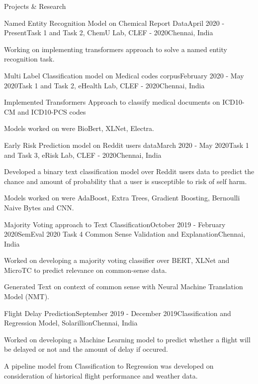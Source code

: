 \documentclass{resume} %
\begin{document}
\begin{rSection}{Projects \& Research}


\begin{rSubsection}{Named Entity Recognition Model on Chemical Report Data}{April 2020 - Present}{Task 1 and Task 2, ChemU Lab, CLEF - 2020}{Chennai, India}
\item Working on implementing transformers approach to solve a named entity recognition task. 
\end{rSubsection}

\begin{rSubsection}{Multi Label Classification model on Medical codes corpus}{February 2020 - May 2020}{Task 1 and Task 2, eHealth Lab, CLEF - 2020}{Chennai, India}
\item Implemented Transformers Approach to classify medical documents on  ICD10-CM and ICD10-PCS codes
\item Models worked on were BioBert, XLNet, Electra. 
\end{rSubsection}

\begin{rSubsection}{Early Risk Prediction model on Reddit users data}{March 2020 - May 2020}{Task 1 and Task 3, eRisk Lab, CLEF - 2020}{Chennai, India}
\item Developed a binary text classification model over Reddit users data to predict the chance and amount of probability that a user is susceptible to risk of self harm.
\item Models worked on were AdaBoost, Extra Trees, Gradient Boosting, Bernoulli Naive Bytes and CNN.
\end{rSubsection}

\begin{rSubsection}{Majority Voting approach to Text Classification}{October 2019 - February 2020}{SemEval 2020 Task 4 Common Sense Validation and Explanation}{Chennai, India}
\item Worked on developing a majority voting classifier over BERT, XLNet and MicroTC to predict relevance on common-sense data.
\item Generated Text on context of common sense with Neural Machine Translation Model (NMT). 
\end{rSubsection}






\begin{rSubsection}{Flight Delay Prediction}{September 2019 - December 2019}{Classification and Regression Model, Solarillion}{Chennai, India}
\item Worked on developing a Machine Learning model to predict whether a flight will be delayed or not and the amount of delay if occured.
\item A pipeline model from Classification to Regression was developed on consideration of historical flight performance and weather data. 
\end{rSubsection}

\end{rSection}
\end{document}

